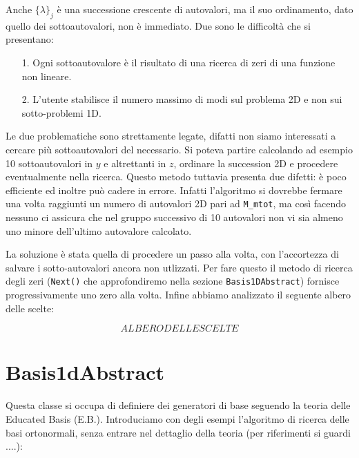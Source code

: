 Anche $\{\lambda\}_j$ \`e una successione crescente di autovalori, ma il suo ordinamento, dato quello dei sottoautovalori, non \`e immediato. Due sono le difficolt\`a che si presentano:
\begin{itemize}
\item[1.] Ogni sottoautovalore \`e il risultato di una ricerca di zeri di una funzione non lineare.
\item[2.] L'utente stabilisce il numero massimo di modi sul problema 2D e non sui sotto-problemi 1D.
\end{itemize}

Le due problematiche sono strettamente legate, difatti non siamo interessati a cercare pi\`u sottoautovalori del necessario. Si poteva partire calcolando ad esempio 10 sottoautovalori in $y$ e altrettanti in $z$, ordinare la succession 2D e procedere eventualmente nella ricerca. Questo metodo tuttavia presenta due difetti: \`e poco efficiente ed inoltre pu\`o cadere in errore. Infatti l'algoritmo si dovrebbe fermare una volta raggiunti un numero di autovalori 2D pari ad \texttt{M\_mtot}, ma cos\`i facendo nessuno ci assicura che nel gruppo successivo di 10 autovalori non vi sia almeno uno minore dell'ultimo autovalore calcolato.

La soluzione \`e stata quella di procedere un passo alla volta, con l'accortezza di salvare i sotto-autovalori ancora non utlizzati. Per fare questo il metodo di ricerca degli zeri (\texttt{Next()} che approfondiremo nella sezione \texttt{Basis1DAbstract}) fornisce progressivamente uno zero alla volta. Infine abbiamo analizzato il seguente albero delle scelte:

\begin{equation}
ALBERO DELLE SCELTE
\end{equation}


 \section{Basis1dAbstract}

Questa classe si occupa di definiere dei generatori di base seguendo la teoria delle Educated Basis (E.B.). Introduciamo con degli esempi l'algoritmo di ricerca delle basi ortonormali, senza entrare nel dettaglio della teoria (per riferimenti si guardi ....):

